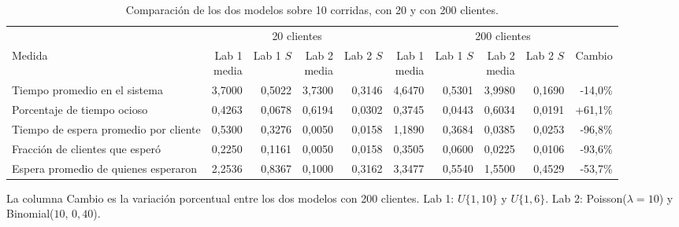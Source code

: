 \begin{table}[H]
\centering
\caption{Comparaci\'on de los dos modelos sobre 10 corridas, con 20 y con 200 clientes.}
\label{tab:cmp}
\footnotesize\setlength{\tabcolsep}{4pt}
\begin{tabular}{@{}lrrrr@{\hspace{1em}}rrrrr@{}}
\toprule
& \multicolumn{4}{c}{20 clientes} & \multicolumn{5}{c}{200 clientes} \\
\cmidrule(lr){2-5}\cmidrule(lr){6-10}
Medida & \makecell{Lab 1\\media} & \makecell{Lab 1\\$S$} & \makecell{Lab 2\\media} & \makecell{Lab 2\\$S$} & \makecell{Lab 1\\media} & \makecell{Lab 1\\$S$} & \makecell{Lab 2\\media} & \makecell{Lab 2\\$S$} & Cambio \\
\midrule
Tiempo promedio en el sistema & 3,7000 & 0,5022 & 3,7300 & 0,3146 & 4,6470 & 0,5301 & 3,9980 & 0,1690 & -14,0\% \\
Porcentaje de tiempo ocioso & 0,4263 & 0,0678 & 0,6194 & 0,0302 & 0,3745 & 0,0443 & 0,6034 & 0,0191 & +61,1\% \\
Tiempo de espera promedio por cliente & 0,5300 & 0,3276 & 0,0050 & 0,0158 & 1,1890 & 0,3684 & 0,0385 & 0,0253 & -96,8\% \\
Fracci\'on de clientes que esper\'o & 0,2250 & 0,1161 & 0,0050 & 0,0158 & 0,3505 & 0,0600 & 0,0225 & 0,0106 & -93,6\% \\
Espera promedio de quienes esperaron & 2,2536 & 0,8367 & 0,1000 & 0,3162 & 3,3477 & 0,5540 & 1,5500 & 0,4529 & -53,7\% \\
\bottomrule
\end{tabular}
\begin{minipage}{\textwidth}\vspace{2pt}\footnotesize
La columna Cambio es la variaci\'on porcentual entre los dos modelos con 200 clientes. Lab 1: $U\{1,10\}$ y $U\{1,6\}$. Lab 2: Poisson($\lambda=10$) y Binomial($10$, $0{,}40$).
\end{minipage}
\end{table}